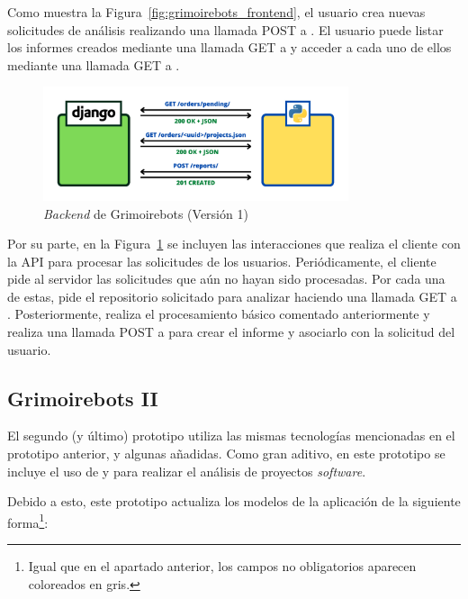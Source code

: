 Como muestra la Figura~\ref{fig:grimoirebots_frontend}, el usuario crea nuevas solicitudes de análisis realizando una llamada POST a . El usuario puede listar los informes creados mediante una llamada GET a  y acceder a cada uno de ellos mediante una llamada GET a .

\begin{figure}[ht]
    \centering
    \includegraphics[width=0.8\textwidth]{Figures/grimoirebots_i_backend}
    \decoRule
    \caption[Grimoirebots I (\emph{Backend})]{\emph{Backend} de Grimoirebots (Versión 1)}
    \label{fig:grimoirebots_i_backend}
\end{figure}

Por su parte, en la Figura~\ref{fig:grimoirebots_i_backend} se incluyen las interacciones que realiza el cliente con la API para procesar las solicitudes de los usuarios. Periódicamente, el cliente pide al servidor las solicitudes que aún no hayan sido procesadas. Por cada una de estas, pide el repositorio solicitado para analizar haciendo una llamada GET a . Posteriormente, realiza el procesamiento básico comentado anteriormente y realiza una llamada POST a  para crear el informe y asociarlo con la solicitud del usuario.

\subsection{Grimoirebots II}

El segundo (y último) prototipo utiliza las mismas tecnologías mencionadas en el prototipo anterior, y algunas añadidas. Como gran aditivo, en este prototipo se incluye el uso de  y  para realizar el análisis de proyectos \emph{software}.

Debido a esto, este prototipo actualiza los modelos de la aplicación de la siguiente forma\footnote{Igual que en el apartado anterior, los campos no obligatorios aparecen coloreados en gris.}:

